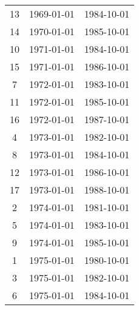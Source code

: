 % 
\begin{tabular}{ccc}
  \hline
  \hline
13 & 1969-01-01 & 1984-10-01 \\ 
  14 & 1970-01-01 & 1985-10-01 \\ 
  10 & 1971-01-01 & 1984-10-01 \\ 
  15 & 1971-01-01 & 1986-10-01 \\ 
  7 & 1972-01-01 & 1983-10-01 \\ 
  11 & 1972-01-01 & 1985-10-01 \\ 
  16 & 1972-01-01 & 1987-10-01 \\ 
  4 & 1973-01-01 & 1982-10-01 \\ 
  8 & 1973-01-01 & 1984-10-01 \\ 
  12 & 1973-01-01 & 1986-10-01 \\ 
  17 & 1973-01-01 & 1988-10-01 \\ 
  2 & 1974-01-01 & 1981-10-01 \\ 
  5 & 1974-01-01 & 1983-10-01 \\ 
  9 & 1974-01-01 & 1985-10-01 \\ 
  1 & 1975-01-01 & 1980-10-01 \\ 
  3 & 1975-01-01 & 1982-10-01 \\ 
  6 & 1975-01-01 & 1984-10-01 \\ 
   \hline
\end{tabular}
